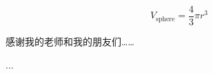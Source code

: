 \documentclass[lang=chs, degree=phd, blindreview=false, winfonts=true]{ya-npu/yanputhesis}
\theoremstyle{plain}%
\theoremstyle{remark}%
\begin{document}
\begin{equation}
    V_{\text{sphere}} = \frac43 \pi r^3
\end{equation}
\cleardoublepage%
\appendix%
\cleardoublepage%
\backmatter                                                 %
\begin{acknowledgements}                                    %
    感谢我的老师和我的朋友们……
\end{acknowledgements}                                      %
\begin{accomplishments}                                     %
    [1] ...
\end{accomplishments}                                       %
\makestatement                                              %
\end{document}
